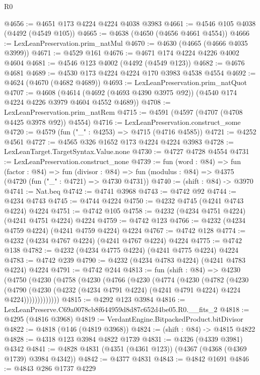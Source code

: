 \begin{lexlean}{R0}
\begin{coremodule}
@4656 := @4651 @173 @4224 @4224 @4038 @3983
@4661 := @4546 @105 @4038 (@4492 (@4549 @105))
@4665 := @4638 (@4650 (@4656 @4661 @4554))
@4666 := LexLeanPreservation.prim_natMul
@4670 := @4630 (@4665 (@4666 @4035 @3999))
@4671 := @4529 @161
@4676 := @4671 @174 @4224 @4226 @4002 @4604
@4681 := @4546 @123 @4002 (@4492 (@4549 @123))
@4682 := @4676 @4681
@4689 := @4530 @173 @4224 @4224 @170 @3983 @4538 @4554
@4692 := @4624 (@4670 (@4682 @4689))
@4693 := LexLeanPreservation.prim_natQuot
@4707 := @4608
    (@4614 (@4692 (@4693 @4390 @3975 @92)) (@4540 @174 @4224 @4226 @3979 @4604 @4552 @4689))
@4708 := LexLeanPreservation.prim_natRem
@4715 := @4591 (@4597 (@4707 (@4708 @4425 @3978 @92)) @4554)
@4716 := LexLeanPreservation.construct_some
@4720 := @4579 (fun ("_" : @4253) => @4715 (@4716 @4585))
@4721 := @4252 @4561
@4727 := @4565 @326 @1652 @173 @4224 @4224 @3983
@4728 := LexLeanTarget.TargetSyntax.Value.none
@4730 := @4727 @4728 @4554
@4731 := LexLeanPreservation.construct_none
@4739 := fun (word : @84) =>
  fun (factor : @84) =>
  fun (divisor : @84) => fun (modulus : @84) => @4375 (@4720 (fun ("_" : @4721) => @4730 @4731))
@4740 := (shift : @84) -> @3970
@4741 := Nat.beq
@4742 := @4741 @3968
@4743 := @4742 @92
@4744 := @4234 @4743
@4745 := @4744 @4224
@4750 := @4232 @4745 (@4241 @4743 @4224) @4224
@4751 := @4742 @105
@4758 := @4232 (@4234 @4751 @4224) (@4241 @4751 @4224) @4224
@4759 := @4742 @123
@4766 := @4232 (@4234 @4759 @4224) (@4241 @4759 @4224) @4224
@4767 := @4742 @128
@4774 := @4232 (@4234 @4767 @4224) (@4241 @4767 @4224) @4224
@4775 := @4742 @138
@4782 := @4232 (@4234 @4775 @4224) (@4241 @4775 @4224) @4224
@4783 := @4742 @239
@4790 := @4232 (@4234 @4783 @4224) (@4241 @4783 @4224) @4224
@4791 := @4742 @244
@4813 := fun (shift : @84) =>
  @4230
    (@4750
      (@4230
        (@4758
          (@4230
            (@4766
              (@4230
                (@4774
                  (@4230
                    (@4782
                      (@4230
                        (@4790
                          (@4230
                            (@4232 (@4234 @4791 @4224) (@4241 @4791 @4224) @4224 @4224)))))))))))))
@4815 := @4292 @123 @3984
@4816 := LexLeanPreserve.C69a0078cb8f644959d8d87c652d4be05.R0.__fits_2
@4818 := @4295 (@4816 @3968)
@4819 := VerdantEngine.BitpackedProduct.bitDivisor
@4822 := @4818 (@146 (@4819 @3968))
@4824 := (shift : @84) -> @4815 @4822
@4828 := @4318 @123 @3984 @4822 @1739
@4831 := @4326 (@4339 @3981) @4342
@4841 := @4828 @4831 (@4351 (@4361 @123)) (@4367 (@4368 (@4369 @1739) @3984 @4342))
@4842 := @4377 @4831
@4843 := @4842 @1691
@4846 := @4843 @286 @1737 @4229

\end{coremodule}
\end{lexlean}
